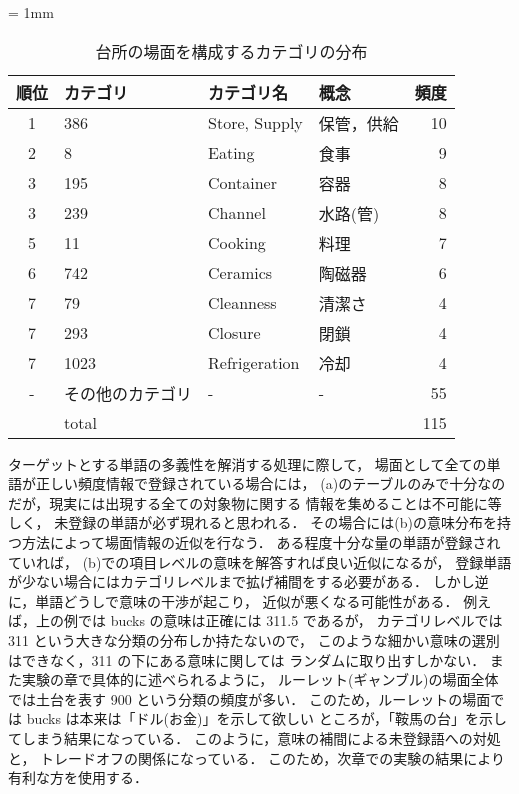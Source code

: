 \small
\begin{table}
  \caption{台所の場面を構成するカテゴリの分布}
  \label{kitchen_distri}
  \begin{center}
    \tabcolsep = 1mm
    \begin{tabular}{|c|l|l|l|r|} \hline
順位    & カテゴリ  & カテゴリ名 & 概念 & 頻度 \\ 
      \hline \hline
      1 & 386       & Store, Supply       & 保管，供給   & 10 \\
      2 & 8         & Eating              & 食事         & 9 \\
      3 & 195       & Container           & 容器         & 8 \\
      3 & 239       & Channel             & 水路(管)     & 8 \\
      5 & 11        & Cooking             & 料理         & 7 \\
      6 & 742       & Ceramics            & 陶磁器       & 6 \\
      7 & 79        & Cleanness           & 清潔さ       & 4 \\
      7 & 293       & Closure             & 閉鎖         & 4 \\
      7 & 1023      & Refrigeration       & 冷却         & 4 \\
      - & その他のカテゴリ    & -                   & -            & 55 \\ \hline
        & total     &                     &              & 115 \\
      \hline
    \end{tabular}
  \end{center}
\end{table}
\normalsize

ターゲットとする単語の多義性を解消する処理に際して，
場面として全ての単語が正しい頻度情報で登録されている場合には，
(a)のテーブルのみで十分なのだが，現実には出現する全ての対象物に関する
情報を集めることは不可能に等しく，
未登録の単語が必ず現れると思われる．
その場合には(b)の意味分布を持つ方法によって場面情報の近似を行なう．
ある程度十分な量の単語が登録されていれば，
(b)での項目レベルの意味を解答すれば良い近似になるが，
登録単語が少ない場合にはカテゴリレベルまで拡げ補間をする必要がある．
しかし逆に，単語どうしで意味の干渉が起こり，
近似が悪くなる可能性がある．
例えば，上の例では bucks の意味は正確には 311.5 であるが，
カテゴリレベルでは 311 という大きな分類の分布しか持たないので，
このような細かい意味の選別はできなく，311 の下にある意味に関しては
ランダムに取り出すしかない．
また実験の章で具体的に述べられるように，
ルーレット(ギャンブル)の場面全体では土台を表す 900 という分類の頻度が多い．
このため，ルーレットの場面では bucks は本来は「ドル(お金)」を示して欲しい
ところが，「鞍馬の台」を示してしまう結果になっている．
このように，意味の補間による未登録語への対処と，
トレードオフの関係になっている．
このため，次章での実験の結果により有利な方を使用する．

